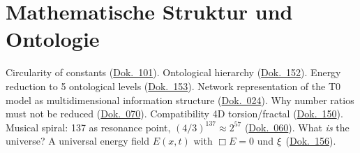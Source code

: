 \section{Mathematische Struktur und Ontologie}
Circularity of constants (\href{https://github.com/jpascher/T0-Time-Mass-Duality/blob/main/2/pdf/101_zirkularitaet-Konstanten_De.pdf}{Dok.~101}). Ontological hierarchy (\href{https://github.com/jpascher/T0-Time-Mass-Duality/blob/main/2/pdf/152_ontologische-ord_De.pdf}{Dok.~152}). Energy reduction to 5 ontological levels (\href{https://github.com/jpascher/T0-Time-Mass-Duality/blob/main/2/pdf/153_energie-reduktion-on_De.pdf}{Dok.~153}). Network representation of the T0 model as multidimensional information structure (\href{https://github.com/jpascher/T0-Time-Mass-Duality/blob/main/2/pdf/024_T0_netze_De.pdf}{Dok.~024}). Why number ratios must not be reduced (\href{https://github.com/jpascher/T0-Time-Mass-Duality/blob/main/2/pdf/070_Mathematische_struktur_De.pdf}{Dok.~070}). Compatibility 4D torsion/fractal (\href{https://github.com/jpascher/T0-Time-Mass-Duality/blob/main/2/pdf/150_kompatiblitaet_De.pdf}{Dok.~150}). Musical spiral: 137 as resonance point, $(4/3)^{137} \approx 2^{57}$ (\href{https://github.com/jpascher/T0-Time-Mass-Duality/blob/main/2/pdf/060_musical-spiral-137-_De.pdf}{Dok.~060}). What \emph{is} the universe? A universal energy field $E(x,t)$ with $\Box E = 0$ und $\xi$ (\href{https://github.com/jpascher/T0-Time-Mass-Duality/blob/main/2/pdf/156_was-ist-universum_De.pdf}{Dok.~156}).

